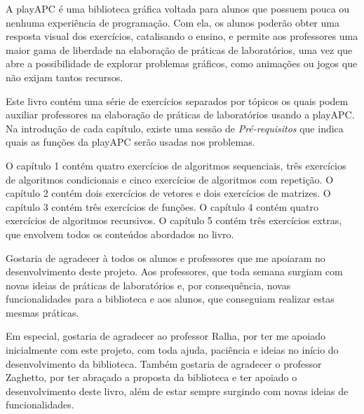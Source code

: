 \documentclass{wileySix}
\begin{document}
\begin{preface}

A playAPC é uma biblioteca gráfica voltada para alunos que possuem pouca ou nenhuma experiência de programação. Com ela, os alunos poderão obter uma resposta visual dos exercícios, catalisando o ensino, e permite aos professores uma maior gama de liberdade na elaboração de práticas de laboratórios, uma vez que abre a possibilidade de explorar problemas gráficos, como animações ou jogos que não exijam tantos recursos.

Este livro contém uma série de exercícios separados por tópicos os quais podem auxiliar professores na elaboração de práticas de laboratórios usando a playAPC. Na introdução de cada capítulo, existe uma sessão de \emph{Pré-requisitos} que indica quais as funções da playAPC serão usadas nos problemas.

O capítulo 1 contém quatro exercícios de algoritmos sequenciais, três exercícios de algoritmos condicionais e cinco exercícios de algoritmos com repetição.
O capítulo 2 contém dois exercícios de vetores e dois exercícios de matrizes.
O capítulo 3 contém três exercícios de funções.
O capítulo 4 contém quatro exercícios de algoritmos recursivos.
O capítulo 5 contém três exercícios extras, que envolvem todos os conteúdos abordados no livro.


\end{preface}


\begin{acknowledgments}
Gostaria de agradecer à todos os alunos e professores que me apoiaram no desenvolvimento deste projeto. Aos professores, que toda semana surgiam com novas ideias de práticas de laboratórios e, por consequência, novas funcionalidades para a biblioteca e aos alunos, que conseguiam realizar estas mesmas práticas.

Em especial, gostaria de agradecer ao professor Ralha, por ter me apoiado inicialmente com este projeto, com toda ajuda, paciência e ideias no início do desenvolvimento da biblioteca.
Também gostaria de agradecer o professor Zaghetto, por ter abraçado a proposta da biblioteca e ter apoiado o desenvolvimento deste livro, além de estar sempre surgindo com novas ideias de funcionalidades.
\end{acknowledgments}

\begin{acronyms}
\end{acronyms}
\end{document}
